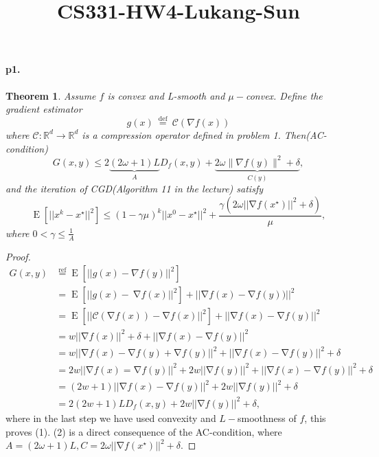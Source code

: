\documentclass[12pt,a4paper]{article}
\title{CS331-HW4-Lukang-Sun}
\newtheorem*{theorem}{Theorem}
\DeclareMathOperator{\n}{\nabla}
\DeclareMathOperator{\E}{\mathrm{E}}
\begin{document}
	\maketitle
	\paragraph{p1.}
	\begin{theorem} 
	Assume $f$ is convex and L-smooth and $\mu-$convex. Define the gradient estimator
	$$
	g(x) \stackrel{\text { def }}{=} \mathcal{C}(\nabla f(x))
	$$
	where $\mathcal{C}: \mathbb{R}^{d} \rightarrow \mathbb{R}^{d}$ is a compression operator defined in problem 1. Then(AC-condition)
	\begin{equation}
		G(x, y) \leq 2 \underbrace{(2 \omega+1) L}_{A} D_{f}(x, y)+\underbrace{2 \omega\|\nabla f(y)\|^{2}+\delta}_{C(y)},
	\end{equation}
	and the iteration of CGD(Algorithm 11 in the lecture) satisfy
	\begin{equation}
		\E\left[||x^k-x^{\star}||^2\right]\leq (1-\gamma\mu)^k||x^0-x^{\star}||^2+\frac{\gamma (2\omega||\n f(x^{\star})||^2+\delta) }{\mu},
	\end{equation}
	where $0<\gamma\leq \frac{1}{A}$
	
	\end{theorem}

	\begin{proof}
	\begin{equation*}
		\begin{aligned}
			G(x,y)&\stackrel{\text{ref}}{=} \E\left[||g(x)-\nabla f(y)||^2\right]\\
					 &=\E\left[||g(x)-\ \n f(x)||^2\right]+||\n f(x)-\n f(y))||^2\\
					 &=\E\left[||\mathcal{C}(\n f(x))-\n f(x)||^2\right]+||\n f(x)-\n f(y)||^2\\
					 &=w||\n f(x)||^2+\delta+||\n f(x)-\n f(y)||^2\\
					 &=w||\n f(x)-\n f(y)+\n f(y)||^2+||\n f(x)-\n f(y)||^2+\delta\\
					 &=2w||\n f(x)=\n f(y)||^2+2w||\n f(y)||^2+||\n f(x)-\n f(y)||^2+\delta\\
					 &=(2w+1)||\n f(x)-\n f(y)||^2+2w||\n f(y)||^2+\delta\\
					 &=2(2w+1)LD_f(x,y)+2w||\n f(y)||^2+\delta,
		\end{aligned}
	\end{equation*}
	where in the last step we have used convexity and $L-$smoothness of $f$, this proves (1). (2) is a direct consequence of the AC-condition, where $A=(2\omega+1)L, C=2\omega||\n f(x^{\star})||^2+\delta.$
	
	\end{proof}
\end{document}
